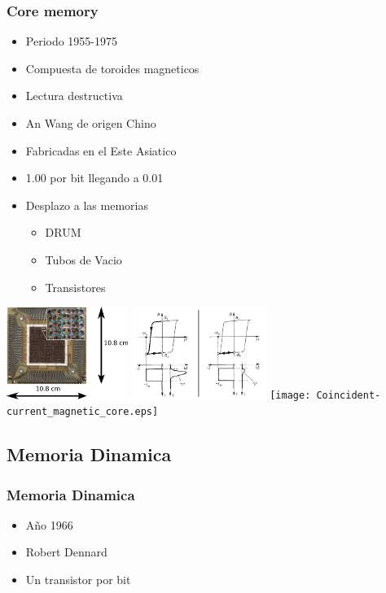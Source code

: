 \documentclass{beamer}
\begin{document}
\begin{frame}
\frametitle{Core memory}
\begin{itemize}
	\item Periodo 1955-1975
	\item Compuesta de toroides magneticos
	\item Lectura destructiva
	\item An Wang de origen Chino
	\item Fabricadas en el Este Asiatico
	\item 1.00 por bit llegando a 0.01 
	\item Desplazo a las memorias
		\begin{itemize}
			\item DRUM
			\item Tubos de Vacio
			\item Transistores
		\end{itemize}
\end{itemize}
\includegraphics[height=3cm]{Ferrite_core_memory.eps}
\includegraphics[height=3cm]{Ringkernspeicher_hysteresekurven_agr.png}
\texttt{[image: Coincident-current\_magnetic\_core.eps]}
\end{frame}

\subsection{Memoria Dinamica}
\begin{frame}
\frametitle{Memoria Dinamica}
\begin{itemize}
	\item Año 1966
	\item Robert Dennard
	\item Un transistor por bit
\end{itemize}
\end{frame}
\end{document}
